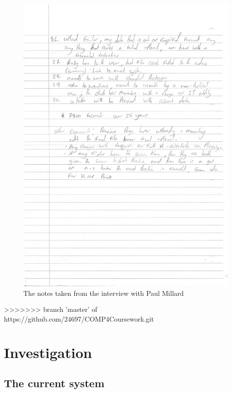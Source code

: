 \begin{figure}[H]
    \includegraphics[width=\textwidth]{./interview/InterviewNotesPage2.pdf}
    \caption{The notes taken from the interview with Paul Millard} \label{fig:Interview notes}
\end{figure}
>>>>>>> branch 'master' of https://github.com/24697/COMP4Coursework.git

\section{Investigation}

\subsection{The current system}

